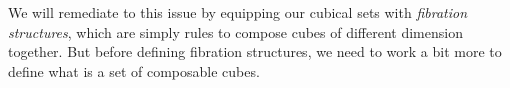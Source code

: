 We will remediate to this issue by equipping our cubical sets with 
\emph{fibration structures}, which are simply rules to compose cubes of
different dimension together.
% 
But before defining fibration structures, we need to work a bit more to
define what is a set of composable cubes.


